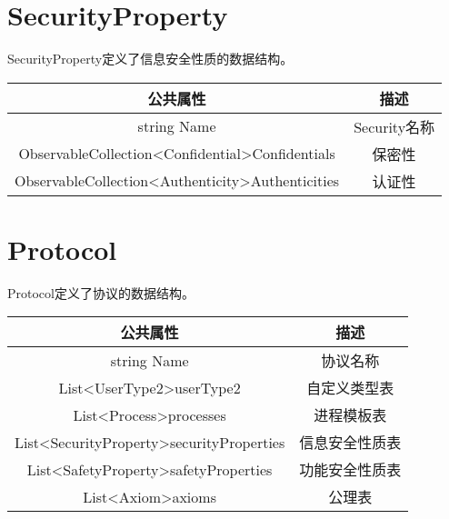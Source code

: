 \section{SecurityProperty}
SecurityProperty定义了信息安全性质的数据结构。
\begin{table}[h]
	\centering
	\begin{tabular}{|c|c|}
		\hline
		\textbf{公共属性}                                                          & \textbf{描述} \\ \hline
		string Name                                                            & Security名称  \\ \hline
		ObservableCollection\textless{}Confidential\textgreater Confidentials  & 保密性         \\ \hline
		ObservableCollection\textless{}Authenticity\textgreater Authenticities & 认证性         \\ \hline
	\end{tabular}
\end{table}

\section{Protocol}
Protocol定义了协议的数据结构。
\begin{table}[h]
	\centering
	\begin{tabular}{|c|c|}
		\hline
		\textbf{公共属性}                                                  & \textbf{描述} \\ \hline
		string Name                                                    & 协议名称        \\ \hline
		List\textless{}UserType2\textgreater userType2                 & 自定义类型表      \\ \hline
		List\textless{}Process\textgreater processes                   & 进程模板表       \\ \hline
		List\textless{}SecurityProperty\textgreater securityProperties & 信息安全性质表     \\ \hline
		List\textless{}SafetyProperty\textgreater safetyProperties     & 功能安全性质表     \\ \hline
		List\textless{}Axiom\textgreater axioms                        & 公理表         \\ \hline
	\end{tabular}
\end{table}